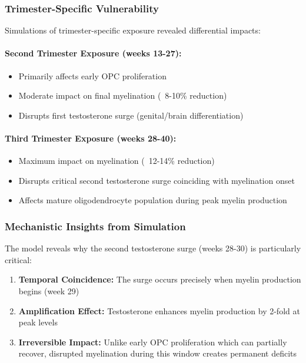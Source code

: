 \documentclass[11pt]{article}
\let\oldsubsubsection\subsubsection
\renewcommand{\subsubsection}[1]{\oldsubsubsection{#1}\setlength{\leftskip}{1.5em}}
\begin{document}
\subsubsection{Trimester-Specific Vulnerability}

Simulations of trimester-specific exposure revealed differential impacts:

\paragraph{Second Trimester Exposure (weeks 13-27):}
\begin{itemize}
\item Primarily affects early OPC proliferation
\item Moderate impact on final myelination (~8-10\% reduction)
\item Disrupts first testosterone surge (genital/brain differentiation)
\end{itemize}

\paragraph{Third Trimester Exposure (weeks 28-40):}
\begin{itemize}
\item Maximum impact on myelination (~12-14\% reduction)
\item Disrupts critical second testosterone surge coinciding with myelination onset
\item Affects mature oligodendrocyte population during peak myelin production
\end{itemize}

\subsubsection{Mechanistic Insights from Simulation}

The model reveals why the second testosterone surge (weeks 28-30) is particularly critical:

\begin{enumerate}
\item \textbf{Temporal Coincidence:} The surge occurs precisely when myelin production begins (week 29)
\item \textbf{Amplification Effect:} Testosterone enhances myelin production by 2-fold at peak levels
\item \textbf{Irreversible Impact:} Unlike early OPC proliferation which can partially recover, disrupted myelination during this window creates permanent deficits
\end{enumerate}
\end{document}

